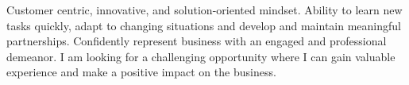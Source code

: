 


\begin{cventries}


\cventry

{ %
\begin{cvitems}
\item {Customer centric, innovative, and solution-oriented mindset. Ability to learn new tasks quickly, adapt to changing situations
and develop and maintain meaningful partnerships. Confidently represent business with an engaged and professional
demeanor. I am looking for a challenging opportunity where I can gain valuable experience and make a positive impact on
the business.}
\end{cvitems}
}


\end{cventries}
